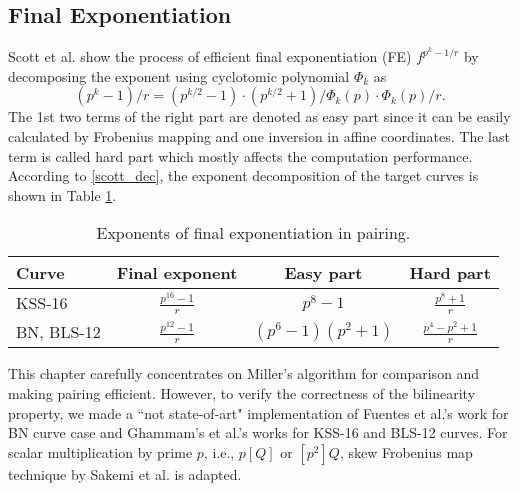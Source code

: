 \subsection{Final Exponentiation}
Scott et al. \cite{PAIRING:SBCDK09a} show the process of efficient final exponentiation (FE) $f^{p^k-1/r}$ by decomposing the exponent using cyclotomic polynomial $\Phi_{k}$ as 
\begin{equation}\label{scott_dec}
(p^k-1)/r = (p^{k/2}-1) \cdot(p^{k/2}+1)/\Phi_{k}(p)\cdot \Phi_{k}(p)/r.
\end{equation}
The 1st two terms of the right part are denoted as easy part since it can be easily calculated by Frobenius mapping and one inversion in affine coordinates. 
The last term is called hard part which mostly affects the computation performance.
According to \eqref{scott_dec}, the exponent decomposition of the target curves is shown in Table \ref{fe_decomp}.
\renewcommand{\baselinestretch}{1.5}
\begin{table}[htb]
\centering
\caption{Exponents of final exponentiation in pairing.}
\label{fe_decomp}
\begin{tabular}{l|c|c|c}
\hline
Curve      & \quad Final exponent                \quad  & \quad Easy part    \quad                   &   \quad Hard part     \quad                                        \\ \hline
KSS-16     & \quad $\frac{p^{16}-1}{r}$ \quad & \quad $p^8-1$                           \quad     & \quad $\frac{p^8+1}{r}$      \quad                                         \\ \hline
BN, BLS-12 \quad \quad &  \quad $\frac{p^{12}-1}{r}$ \quad & \quad $(p^6-1)(p^2+1)$ \quad & \quad $\frac{p^4-p^2+1}{r}$  \quad\\
\hline
\end{tabular}
\end{table}
\renewcommand{\baselinestretch}{1.0}

This chapter carefully concentrates on Miller's algorithm for comparison and making pairing efficient. However, to verify the correctness of the bilinearity property,  we made a ``not state-of-art" implementation of  Fuentes et al.'s work \cite{SAC:FueKnaRod11} for  BN curve case and  Ghammam's et al.'s works \cite{EPRINT:GhaFou16b,EPRINT:GhaFou16a} for KSS-16 and BLS-12 curves.
For scalar multiplication by prime $p$, i.e., $p[Q]$ or $[p^2]Q$, skew Frobenius map technique by Sakemi et al. \cite{CANS:SNOKM08} is adapted.



